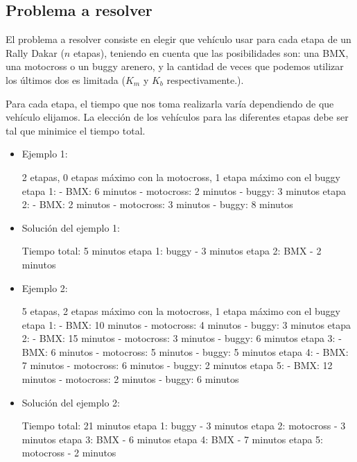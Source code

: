 \subsection{Problema a resolver}

El problema a resolver consiste en elegir que vehículo usar para cada etapa de un Rally Dakar ($n$ etapas), teniendo en cuenta que las posibilidades son: una BMX, una motocross o un buggy arenero, y la cantidad de veces que podemos utilizar los últimos dos es limitada ($K_m$ y $K_b$ respectivamente.).

Para cada etapa, el tiempo que nos toma realizarla varía dependiendo de que vehículo elijamos. La elección de los vehículos para las diferentes etapas debe ser tal que minimice el tiempo total.

\begin{itemize}
\item Ejemplo 1:

\begin{codesnippet}
2 etapas, 0 etapas máximo con la motocross, 1 etapa máximo con el buggy
etapa 1:
    - BMX: 6 minutos
    - motocross: 2 minutos
    - buggy: 3 minutos
etapa 2:
    - BMX: 2 minutos
    - motocross: 3 minutos
    - buggy: 8 minutos
\end{codesnippet}
\item Solución del ejemplo 1:

\begin{codesnippet}
Tiempo total: 5 minutos
etapa 1: buggy - 3 minutos
etapa 2: BMX - 2 minutos
\end{codesnippet}
\item Ejemplo 2:

\begin{codesnippet}
5 etapas, 2 etapas máximo con la motocross, 1 etapa máximo con el buggy
etapa 1:
    - BMX: 10 minutos
    - motocross: 4 minutos
    - buggy: 3 minutos
etapa 2:
    - BMX: 15 minutos
    - motocross: 3 minutos
    - buggy: 6 minutos
etapa 3:
    - BMX: 6 minutos
    - motocross: 5 minutos
    - buggy: 5 minutos
etapa 4:
    - BMX: 7 minutos
    - motocross: 6 minutos
    - buggy: 2 minutos
etapa 5:
    - BMX: 12 minutos
    - motocross: 2 minutos
    - buggy: 6 minutos
\end{codesnippet}
\item Solución del ejemplo 2:

\begin{codesnippet}
Tiempo total: 21 minutos
etapa 1: buggy - 3 minutos
etapa 2: motocross - 3 minutos
etapa 3: BMX - 6 minutos
etapa 4: BMX - 7 minutos
etapa 5: motocross - 2 minutos
\end{codesnippet}
\end{itemize}

